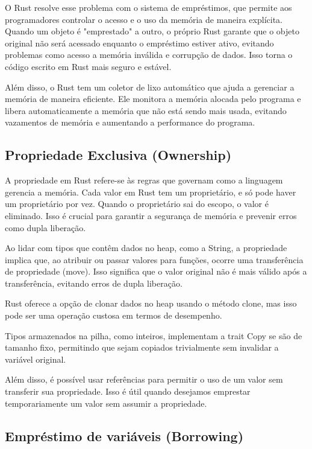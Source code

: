 \documentclass[12pt,a4paper,oneside]{abntex2}
\begin{document}
O Rust resolve esse problema com o sistema de empréstimos, que permite aos programadores controlar o acesso e o uso da memória de maneira explícita. Quando um objeto é "emprestado" a outro, o próprio Rust garante que o objeto original não será acessado enquanto o empréstimo estiver ativo, evitando problemas como acesso a memória inválida e corrupção de dados. Isso torna o código escrito em Rust mais seguro e estável.

Além disso, o Rust tem um coletor de lixo automático que ajuda a gerenciar a memória de maneira eficiente. Ele monitora a memória alocada pelo programa e libera automaticamente a memória que não está sendo mais usada, evitando vazamentos de memória e aumentando a performance do programa.


\subsection{Propriedade Exclusiva (Ownership)}
A propriedade em Rust refere-se às regras que governam como a linguagem gerencia a memória. Cada valor em Rust tem um proprietário, e só pode haver um proprietário por vez. Quando o proprietário sai do escopo, o valor é eliminado. Isso é crucial para garantir a segurança de memória e prevenir erros como dupla liberação.

Ao lidar com tipos que contêm dados no heap, como a String, a propriedade implica que, ao atribuir ou passar valores para funções, ocorre uma transferência de propriedade (move). Isso significa que o valor original não é mais válido após a transferência, evitando erros de dupla liberação.

Rust oferece a opção de clonar dados no heap usando o método clone, mas isso pode ser uma operação custosa em termos de desempenho.

Tipos armazenados na pilha, como inteiros, implementam a trait Copy se são de tamanho fixo, permitindo que sejam copiados trivialmente sem invalidar a variável original.

Além disso, é possível usar referências para permitir o uso de um valor sem transferir sua propriedade. Isso é útil quando desejamos emprestar temporariamente um valor sem assumir a propriedade.

 


\subsection{Empréstimo de variáveis (Borrowing)}
\end{document}
